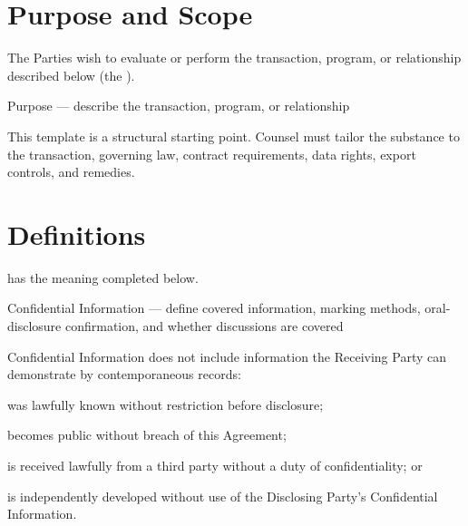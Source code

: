 \documentclass{linearspace-legal}
\begin{document}
\begin{LSForm}
\section{Purpose and Scope}

\begin{legalclauses}
  \item The Parties wish to evaluate or perform the transaction, program, or
  relationship described below (the ).

    {Purpose --- describe the transaction, program, or relationship}

  \item This template is a structural starting point. Counsel must tailor the
  substance to the transaction, governing law, contract requirements, data
  rights, export controls, and remedies.
\end{legalclauses}

\section{Definitions}

\begin{legalclauses}
  \item {} has the meaning completed below.

    {Confidential Information --- define covered information, marking methods,
     oral-disclosure confirmation, and whether discussions are covered}

  \item Confidential Information does not include information the Receiving
  Party can demonstrate by contemporaneous records:
  \begin{legalclauses}
    \item was lawfully known without restriction before disclosure;
    \item becomes public without breach of this Agreement;
    \item is received lawfully from a third party without a duty of
    confidentiality; or
    \item is independently developed without use of the Disclosing Party's
    Confidential Information.
  \end{legalclauses}
\end{legalclauses}


\end{LSForm}
\end{document}
